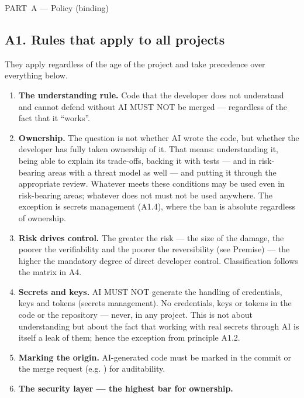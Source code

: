\begin{partbanner}[navy]
\mbox{PART A} --- Policy (binding)
\end{partbanner}

\subsection{A1. Rules that apply to all projects}

They apply regardless of the age of the project and take precedence over everything below.

\begin{enumerate}[label=\textbf{A1.\arabic*}]
\item \textbf{The understanding rule.}
Code that the developer does not understand and cannot defend without AI MUST NOT be merged --- regardless of the fact that it \enquote{works}.
\item \textbf{Ownership.}
The question is not whether AI wrote the code, but whether the developer has fully taken ownership of it.
That means: understanding it, being able to explain its trade-offs, backing it with tests --- and in risk-bearing areas with a threat model as well --- and putting it through the appropriate review.
Whatever meets these conditions may be used even in risk-bearing areas; whatever does not must not be used anywhere.
The exception is secrets management (A1.4), where the ban is absolute regardless of ownership.
\item \textbf{Risk drives control.}
The greater the risk --- the size of the damage, the poorer the verifiability and the poorer the reversibility (see Premise) --- the higher the mandatory degree of direct developer control.
Classification follows the matrix in A4.
\item \textbf{Secrets and keys.}
AI MUST NOT generate the handling of credentials, keys and tokens (secrets management).
No credentials, keys or tokens in the code or the repository --- never, in any project.
This is not about understanding but about the fact that working with real secrets through AI is itself a leak of them; hence the exception from principle A1.2.
\item \textbf{Marking the origin.}
AI-generated code must be marked in the commit or the merge request (e.g. \code{[ai-generated]}) for auditability.
\item \textbf{The security layer --- the highest bar for ownership.}

\end{enumerate}
